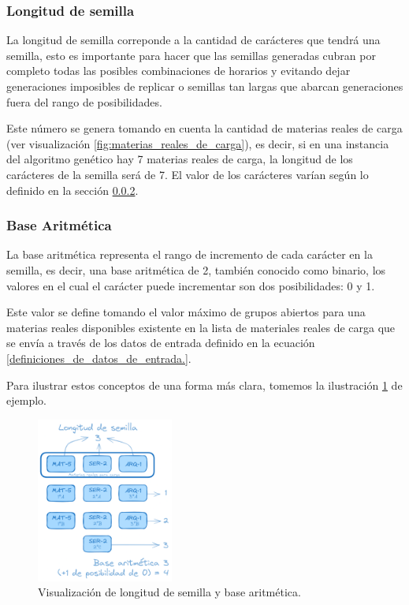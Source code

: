 \subsubsection{Longitud de semilla}\label{longitud_de_semilla}
La longitud de semilla correponde a la cantidad de carácteres que tendrá una semilla, esto es importante para hacer que las semillas generadas cubran por completo todas las posibles combinaciones de horarios y evitando dejar generaciones imposibles de replicar o semillas tan largas que abarcan generaciones fuera del rango de posibilidades. 

Este número se genera tomando en cuenta la cantidad de materias reales de carga (ver visualización \ref{fig:materias_reales_de_carga}), es decir, si en una instancia del algoritmo genético hay 7 materias reales de carga, la longitud de los carácteres de la semilla será de 7. El valor de los carácteres varían según lo definido en la sección \ref{base_aritmetica}.

\subsubsection{Base Aritmética} \label{base_aritmetica}
La base aritmética representa el rango de incremento de cada carácter en la semilla, es decir, una base aritmética de 2, también conocido como binario, los valores en el cual el carácter puede incrementar son dos posibilidades: 0 y 1.

Este valor se define tomando el valor máximo de grupos abiertos para una materias reales disponibles existente en la lista de materiales reales de carga que se envía a través de los datos de entrada definido en la ecuación \ref{definiciones_de_datos_de_entrada.}.

Para ilustrar estos conceptos de una forma más clara, tomemos la ilustración \ref{fig:semilla-base-aritmetica} de ejemplo.

\begin{figure}[h]
    \centering
    \includegraphics[width=0.4\textwidth]{images/semilla.png}
    \caption{Visualización de longitud de semilla y base aritmética.}
    \label{fig:semilla-base-aritmetica}
\end{figure}

